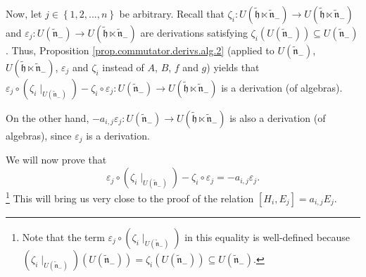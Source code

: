 \documentclass[etingof-lie.tex]{subfiles}
\begin{document}
Now, let $j\in\left\{  1,2,...,n\right\}  $ be arbitrary. Recall that
$\zeta_{i}:U\left(  \widetilde{\mathfrak{h}}\ltimes\widetilde{\mathfrak{n}%
}_{-}\right)  \rightarrow U\left(  \widetilde{\mathfrak{h}}\ltimes
\widetilde{\mathfrak{n}}_{-}\right)  $ and $\varepsilon_{j}:U\left(
\widetilde{\mathfrak{n}}_{-}\right)  \rightarrow U\left(
\widetilde{\mathfrak{h}}\ltimes\widetilde{\mathfrak{n}}_{-}\right)  $ are
derivations satisfying $\zeta_{i}\left(  U\left(  \widetilde{\mathfrak{n}}%
_{-}\right)  \right)  \subseteq U\left(  \widetilde{\mathfrak{n}}_{-}\right)
$. Thus, Proposition \ref{prop.commutator.derivs.alg.2} (applied to $U\left(
\widetilde{\mathfrak{n}}_{-}\right)  $, $U\left(  \widetilde{\mathfrak{h}%
}\ltimes\widetilde{\mathfrak{n}}_{-}\right)  $, $\varepsilon_{j}$ and
$\zeta_{i}$ instead of $A$, $B$, $f$ and $g$) yields that $\varepsilon
_{j}\circ\left(  \zeta_{i}\mid_{U\left(  \widetilde{\mathfrak{n}}_{-}\right)
}\right)  -\zeta_{i}\circ\varepsilon_{j}:U\left(  \widetilde{\mathfrak{n}}%
_{-}\right)  \rightarrow U\left(  \widetilde{\mathfrak{h}}\ltimes
\widetilde{\mathfrak{n}}_{-}\right)  $ is a derivation (of algebras).

On the other hand, $-a_{i,j}\varepsilon_{j}:U\left(  \widetilde{\mathfrak{n}%
}_{-}\right)  \rightarrow U\left(  \widetilde{\mathfrak{h}}\ltimes
\widetilde{\mathfrak{n}}_{-}\right)  $ is also a derivation (of algebras),
since $\varepsilon_{j}$ is a derivation.

We will now prove that%
\begin{equation}
\varepsilon_{j}\circ\left(  \zeta_{i}\mid_{U\left(  \widetilde{\mathfrak{n}%
}_{-}\right)  }\right)  -\zeta_{i}\circ\varepsilon_{j}=-a_{i,j}\varepsilon
_{j}. \label{pf.gtilde.dercomm1}%
\end{equation}
\footnote{Note that the term $\varepsilon_{j}\circ\left(  \zeta_{i}%
\mid_{U\left(  \widetilde{\mathfrak{n}}_{-}\right)  }\right)  $ in this
equality is well-defined because $\left(  \zeta_{i}\mid_{U\left(
\widetilde{\mathfrak{n}}_{-}\right)  }\right)  \left(  U\left(
\widetilde{\mathfrak{n}}_{-}\right)  \right)  =\zeta_{i}\left(  U\left(
\widetilde{\mathfrak{n}}_{-}\right)  \right)  \subseteq U\left(
\widetilde{\mathfrak{n}}_{-}\right)  $.} This will bring us very close to the
proof of the relation $\left[  H_{i},E_{j}\right]  =a_{i,j}E_{j}$.
\end{document}
